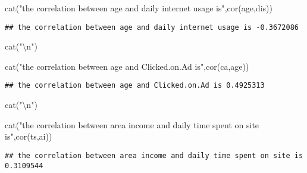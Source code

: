 \documentclass[
]{article}
\newenvironment{Shaded}{\begin{snugshade}}{\end{snugshade}}
\newcommand{\FunctionTok}[1]{\textcolor[rgb]{0.00,0.00,0.00}{#1}}
\newcommand{\NormalTok}[1]{#1}
\newcommand{\SpecialCharTok}[1]{\textcolor[rgb]{0.00,0.00,0.00}{#1}}
\newcommand{\StringTok}[1]{\textcolor[rgb]{0.31,0.60,0.02}{#1}}
\begin{document}
\begin{Shaded}
\begin{Highlighting}[]
\FunctionTok{cat}\NormalTok{(}\StringTok{"the correlation between age and daily internet usage is"}\NormalTok{,}\FunctionTok{cor}\NormalTok{(age,dis))}
\end{Highlighting}
\end{Shaded}

\begin{verbatim}
## the correlation between age and daily internet usage is -0.3672086
\end{verbatim}

\begin{Shaded}
\begin{Highlighting}[]
\FunctionTok{cat}\NormalTok{(}\StringTok{"}\SpecialCharTok{\textbackslash{}n}\StringTok{"}\NormalTok{)}
\end{Highlighting}
\end{Shaded}

\begin{Shaded}
\begin{Highlighting}[]
\FunctionTok{cat}\NormalTok{(}\StringTok{"the correlation between age and Clicked.on.Ad is"}\NormalTok{,}\FunctionTok{cor}\NormalTok{(ca,age))}
\end{Highlighting}
\end{Shaded}

\begin{verbatim}
## the correlation between age and Clicked.on.Ad is 0.4925313
\end{verbatim}

\begin{Shaded}
\begin{Highlighting}[]
\FunctionTok{cat}\NormalTok{(}\StringTok{"}\SpecialCharTok{\textbackslash{}n}\StringTok{"}\NormalTok{)}
\end{Highlighting}
\end{Shaded}

\begin{Shaded}
\begin{Highlighting}[]
\FunctionTok{cat}\NormalTok{(}\StringTok{"the correlation between area income and daily time spent on site is"}\NormalTok{,}\FunctionTok{cor}\NormalTok{(ts,ai))}
\end{Highlighting}
\end{Shaded}

\begin{verbatim}
## the correlation between area income and daily time spent on site is 0.3109544
\end{verbatim}
\end{document}
